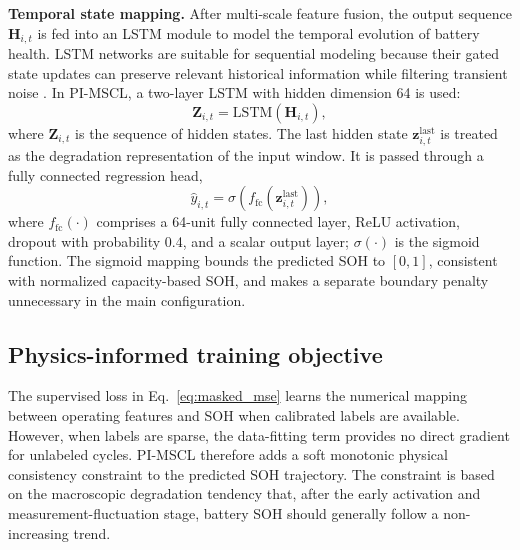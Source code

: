 \documentclass[pdflatex,sn-mathphys-num]{sn-jnl}
\begin{document}
\noindent\textbf{Temporal state mapping.}
After multi-scale feature fusion, the output sequence $\mathbf{H}_{i,t}$ is fed into an LSTM module to model the temporal evolution of battery health. LSTM networks are suitable for sequential modeling because their gated state updates can preserve relevant historical information while filtering transient noise \cite{hochreiter1997long}. In PI-MSCL, a two-layer LSTM with hidden dimension 64 is used:
\begin{equation}
\mathbf{Z}_{i,t}=\mathrm{LSTM}\left(\mathbf{H}_{i,t}\right),
\label{eq:lstm_sequence}
\end{equation}
where $\mathbf{Z}_{i,t}$ is the sequence of hidden states. The last hidden state $\mathbf{z}_{i,t}^{\mathrm{last}}$ is treated as the degradation representation of the input window. It is passed through a fully connected regression head,
\begin{equation}
\hat{y}_{i,t}=\sigma\left(f_{\mathrm{fc}}\left(\mathbf{z}_{i,t}^{\mathrm{last}}\right)\right),
\label{eq:soh_regression}
\end{equation}
where $f_{\mathrm{fc}}(\cdot)$ comprises a 64-unit fully connected layer, ReLU activation, dropout with probability 0.4, and a scalar output layer; $\sigma(\cdot)$ is the sigmoid function. The sigmoid mapping bounds the predicted SOH to $[0,1]$, consistent with normalized capacity-based SOH, and makes a separate boundary penalty unnecessary in the main configuration.

\subsection{Physics-informed training objective}
\label{subsec:objective}

The supervised loss in Eq.~\eqref{eq:masked_mse} learns the numerical mapping between operating features and SOH when calibrated labels are available. However, when labels are sparse, the data-fitting term provides no direct gradient for unlabeled cycles. PI-MSCL therefore adds a soft monotonic physical consistency constraint to the predicted SOH trajectory. The constraint is based on the macroscopic degradation tendency that, after the early activation and measurement-fluctuation stage, battery SOH should generally follow a non-increasing trend.
\end{document}
